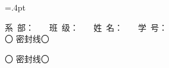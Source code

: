 \usepackage[utf8]{inputenc}

\usepackage[paperwidth=36.8cm,paperheight=26cm,
top=2cm,bottom=2cm,right=2cm,left=3.cm,
columnsep=1.5cm]{geometry}
\columnseprule=.4pt

\usepackage{amsmath}
\usepackage{amsfonts}
\usepackage{amssymb}

\usepackage{makeidx}

\usepackage{graphicx}
\usepackage{setspace}
\usepackage{tabu}
\usepackage{paralist}
\usepackage{lastpage}
\usepackage{enumerate} 

\usepackage{fancyhdr}
\renewcommand{\headrulewidth}{0pt}
\pagestyle{fancy}

\newsavebox{\zdxa}%

\sbox{\zdxa}
{\parbox{27cm}{\centering \heiti \hspace{1cm}
		系~部：\underline{\makebox[30mm][c]{}}~~~ 班~级：\underline{\makebox[45mm][c]{}}~~~ 姓~名：\underline{\makebox[30mm][c]{}}~~~ 学~号：\underline{\makebox[30mm][c]{}} \\
		\vspace{1mm}
	  \dotfill{} 〇 \dotfill{} 密\dotfill{}封\dotfill{}线\dotfill{}〇\dotfill{} \\
}}
\newsavebox{\zdxb}%
\sbox{\zdxb}
{\parbox{27cm}{\centering \heiti
		\vspace{30mm}
		\vspace{1mm}
		\dotfill{} 〇 \dotfill{}密\dotfill{}封\dotfill{}线\dotfill{}〇\dotfill{} \\
}}

\newcommand{\putzdx}{
		\hspace{-1.7cm}\parbox{1cm}{\vspace{-1.5cm}
			\rotatebox[origin=c]{90}{
				\usebox{\zdxa}
		}}
}
\newcommand{\putzdxx}{
	\hspace{0.3cm}\parbox{1cm}{\vspace{-1.5cm}
		\rotatebox[origin=c]{-90}{
			\usebox{\zdxb}
	}}
}


\usepackage{ifthen}

